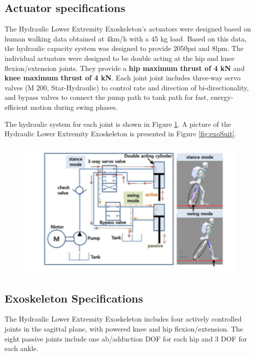 \subsection{Actuator specifications}

The Hydraulic Lower Extremity Exoskeleton's actuators were designed based on human walking data obtained at 4km/h with a 45 kg load.  Based on this data, the hydraulic capacity system was designed to provide 2050psi and 8lpm.  The individual actuators were designed to be double acting at the hip and knee flexion/extension joints. They provide a {\bf hip maximum thrust of 4 kN} and {\bf knee maximum thrust of 4 kN}.  Each joint joint includes three-way servo valves (M 200, Star-Hydraulic) to control rate and direction of bi-directionality, and bypass valves to connect the pump path to tank path for fast, energy-efficient motion during swing phases.   

The hydraulic system for each joint is shown in Figure \ref{fig:hydraulicSys}.
A picture of the Hydraulic Lower Extremity Exoskeleton is presented in Figure \ref{fig:exoSuit}.
\begin{figure}[thpb]
\centering
\includegraphics[width=3.in]{exos/figs/hydLowerExrem/hydraulicSys}
  \caption{}
  \vspace{-0.2in}
 \label{fig:hydraulicSys}   
 \end{figure} 


 

 
 \subsection{Exoskeleton Specifications}
 
 The Hydraulic Lower Extremity Exoskeleton includes four actively controlled joints in the sagittal plane, with powered knee and hip flexion/extension.  The eight passive joints include one ab/adduction DOF for each hip and 3 DOF for each ankle.
 
